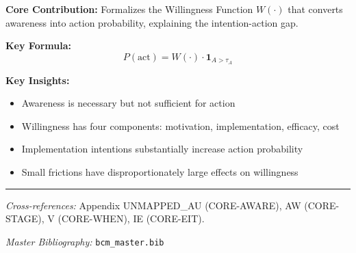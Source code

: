 \begin{tcolorbox}[colback=gray!5!white, colframe=gray!75!black,
    title=Appendix UNMAPPED_AV Summary: CORE-READY]

\textbf{Core Contribution:}
Formalizes the Willingness Function $W(\cdot)$ that converts awareness into
action probability, explaining the intention-action gap.

\textbf{Key Formula:}
\begin{equation}
P(\text{act}) = W(\cdot) \cdot \mathbf{1}_{A > \tau_A}
\end{equation}

\textbf{Key Insights:}
\begin{itemize}[nosep]
\item Awareness is necessary but not sufficient for action
\item Willingness has four components: motivation, implementation, efficacy, cost
\item Implementation intentions substantially increase action probability
\item Small frictions have disproportionately large effects on willingness
\end{itemize}

\end{tcolorbox}

\vspace{1em}
\hrule
\vspace{0.5em}

\noindent\textit{Cross-references:}
Appendix UNMAPPED_AU (CORE-AWARE), AW (CORE-STAGE), V (CORE-WHEN), IE (CORE-EIT).

\noindent\textit{Master Bibliography:} \texttt{bcm\_master.bib}

\nocite{bcm_master}

